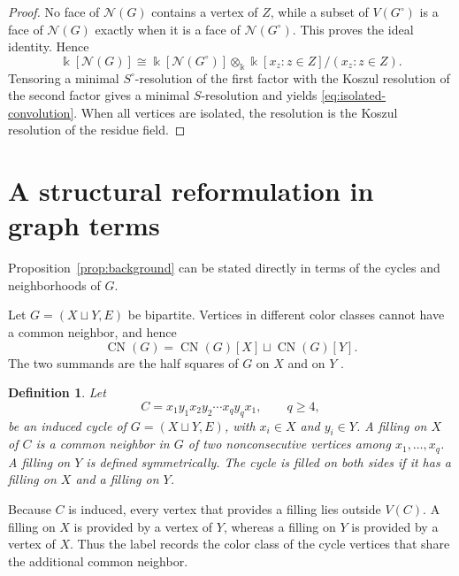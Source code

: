 \documentclass[10pt,a4paper]{amsart}
\newtheorem{definition}[theorem]{Definition}
\numberwithin{equation}{section}
\newcommand{\NN}{\mathcal N}
\newcommand{\CN}{\operatorname{CN}}
\begin{document}
	\begin{proof}
		No face of \(\NN(G)\) contains a vertex of \(Z\), while a subset of
		\(V(G^{\circ})\) is a face of \(\NN(G)\) exactly when it is a face of
		\(\NN(G^{\circ})\). This proves the ideal identity. Hence
		\[
		\Bbbk[\NN(G)]
		\cong
		\Bbbk[\NN(G^{\circ})]
		\otimes_{\Bbbk}
		\Bbbk[x_z:z\in Z]/(x_z:z\in Z).
		\]
		Tensoring a minimal \(S^{\circ}\)-resolution of the first factor with the
		Koszul resolution of the second factor gives a minimal \(S\)-resolution and
		yields \eqref{eq:isolated-convolution}. When all vertices are isolated, the resolution is the Koszul resolution of
		the residue field.
	\end{proof}
	
	\section{A structural reformulation in graph terms}\label{sec:structure}
	
	Proposition~\ref{prop:background} can be stated directly in terms of the
	cycles and neighborhoods of \(G\).
	
	Let \(G=(X\sqcup Y,E)\) be bipartite. Vertices in different color classes
	cannot have a common neighbor, and hence
	\begin{equation}\label{eq:half-square-decomposition}
		\CN(G)=\CN(G)[X]\sqcup\CN(G)[Y].
	\end{equation}
	The two summands are the half squares of \(G\) on \(X\) and on \(Y\)
	\cite{LeLe2019}.
	
	
	
	\begin{definition}
		Let
		\[
		C=x_1 y_1 x_2 y_2\cdots x_q y_q x_1,\qquad q\ge4,
		\]
		be an induced cycle of \(G=(X\sqcup Y,E)\), with \(x_i\in X\) and
		\(y_i\in Y\). A \emph{filling on \(X\)} of \(C\) is a common neighbor in
		\(G\) of two nonconsecutive vertices among \(x_1,\ldots,x_q\). A
		\emph{filling on \(Y\)} is defined symmetrically. The cycle is
		\emph{filled on both sides} if it has a filling on \(X\) and a filling on \(Y\).
	\end{definition}
	
	Because \(C\) is induced, every vertex that provides a filling lies outside
	\(V(C)\). A filling on \(X\) is provided by a vertex of \(Y\), whereas a
	filling on \(Y\) is provided by a vertex of \(X\). Thus the label records the
	color class of the cycle vertices that share the additional common neighbor.
	
\end{document}
